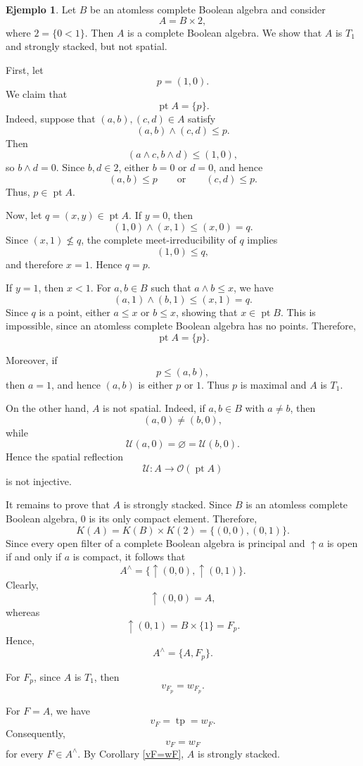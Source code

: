 \documentclass[11pt]{amsart}
\DeclareMathOperator{\pt}{pt}
\theoremstyle{plain}
\theoremstyle{definition}
\newtheorem{ej}[thm]{Ejemplo}
\begin{document}
\begin{ej}\label{T1+S no espacial}
Let $B$ be an atomless complete Boolean algebra and consider
\[
A=B\times 2,
\]
where $2=\{0<1\}$. Then $A$ is a complete Boolean algebra. We show that $A$
is $T_1$ and strongly stacked, but not spatial.

First, let
\[
p=(1,0).
\]
We claim that
\[
\pt A=\{p\}.
\]
Indeed, suppose that $(a,b),(c,d)\in A$ satisfy
\[
(a,b)\wedge(c,d)\leq p.
\]
Then
\[
(a\wedge c,b\wedge d)\leq(1,0),
\]
so $b\wedge d=0$. Since $b,d\in 2$, either $b=0$ or $d=0$, and hence
\[
(a,b)\leq p
\qquad\text{or}\qquad
(c,d)\leq p.
\]
Thus, $p\in\pt A$.

Now, let $q=(x,y)\in\pt A$. If $y=0$, then
\[
(1,0)\wedge(x,1)\leq(x,0)=q.
\]
Since $(x,1)\nleq q$, the complete meet-irreducibility of $q$ implies
\[
(1,0)\leq q,
\]
and therefore $x=1$. Hence $q=p$.

If $y=1$, then $x<1$. For $a,b\in B$ such that $a\wedge b\leq x$, we have
\[
(a,1)\wedge(b,1)\leq(x,1)=q.
\]
Since $q$ is a point, either $a\leq x$ or $b\leq x$, showing that
$x\in\pt B$. This is impossible, since an atomless complete Boolean algebra
has no points. Therefore,
\[
\pt A=\{p\}.
\]

Moreover, if
\[
p\leq(a,b),
\]
then $a=1$, and hence $(a,b)$ is either $p$ or $1$. Thus $p$ is maximal and
$A$ is $T_1$.

On the other hand, $A$ is not spatial. Indeed, if $a,b\in B$ with $a\neq b$,
then
\[
(a,0)\neq(b,0),
\]
while
\[
\mathcal{U}(a,0)=\varnothing=\mathcal{U}(b,0).
\]
Hence the spatial reflection
\[
\mathcal{U}\colon A\longrightarrow\mathcal{O}(\pt A)
\]
is not injective.

It remains to prove that $A$ is strongly stacked. Since $B$ is an atomless
complete Boolean algebra, $0$ is its only compact element. Therefore,
\[
K(A)=K(B)\times K(2)=\{(0,0),(0,1)\}.
\]
Since every open filter of a complete Boolean algebra is principal and
$\uparrow a$ is open if and only if $a$ is compact, it follows that
\[
A^\wedge=\{\uparrow(0,0),\uparrow(0,1)\}.
\]
Clearly,
\[
\uparrow(0,0)=A,
\]
whereas
\[
\uparrow(0,1)=B\times\{1\}=F_p.
\]
Hence,
\[
A^\wedge=\{A,F_p\}.
\]

For $F_p$, since $A$ is $T_1$, then
\[
v_{F_p}=w_{F_p}.
\]

For $F=A$, we have
\[
v_F=\operatorname{tp}=w_F.
\]
Consequently,
\[
v_F=w_F
\]
for every $F\in A^\wedge$. By Corollary \ref{vF=wF}, $A$ is strongly stacked.
\end{ej}
\end{document}
